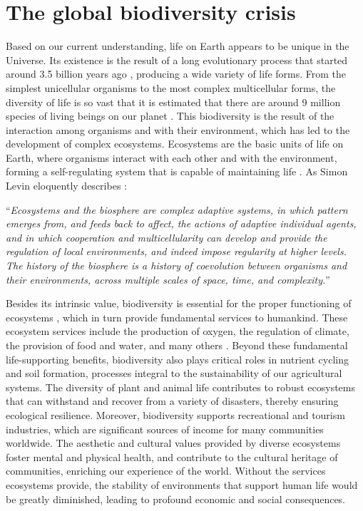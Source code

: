 \setcounter{page}{1}

\section{\label{sec:The global biodiversity crisis} The global biodiversity
  crisis}

Based on our current understanding, life on Earth appears to be unique in the
Universe. Its existence is the result of a long evolutionary process that
started around 3.5 billion years ago \cite{Taylor_1993,Schopf2006},
producing a wide variety of life forms. From the simplest unicellular organisms
to the most complex multicellular forms, the diversity of life is so vast that
it is estimated that there are around 9 million species of living beings on our
planet \cite{Cardinale2012}. This biodiversity is the result of the interaction
among organisms and with their environment, which has led to the development of
complex ecosystems. Ecosystems are the basic units of life on Earth, where
organisms interact with each other and with the environment, forming a
self-regulating system that is capable of maintaining life \cite{Levin2005}.
As Simon Levin eloquently describes \cite{Levin2005}:

\begin{displayquote}
  ``\textit{Ecosystems and the biosphere are complex adaptive systems, in which
    pattern
    emerges from, and feeds back to affect, the actions of adaptive individual
    agents, and in which cooperation and multicellularity can develop and
    provide
    the regulation of local environments, and indeed impose regularity at
    higher
    levels. The history of the biosphere is a history of coevolution between
    organisms and their environments, across multiple scales of space, time,
    and
    complexity.}''
\end{displayquote}

Besides its intrinsic value, biodiversity is essential for the proper
functioning of ecosystems \cite{Gamfeldt2008}, which in turn provide
fundamental services to humankind. These ecosystem services include the
production of oxygen, the regulation of climate, the provision of food and
water, and many others \cite{Daily1997}. Beyond these fundamental
life-supporting benefits, biodiversity also plays critical roles in nutrient
cycling and soil formation, processes integral to the sustainability of our
agricultural systems. The diversity of plant and animal life contributes to
robust ecosystems that can withstand and recover from a variety of disasters,
thereby ensuring ecological resilience. Moreover, biodiversity supports
recreational and tourism industries, which are significant sources of income
for many communities worldwide. The aesthetic and cultural values provided by
diverse ecosystems foster mental and physical health, and contribute to the
cultural heritage of communities, enriching our experience of the world.
Without the services ecosystems provide, the stability of environments that
support human life would be greatly diminished, leading to profound economic
and social consequences.

